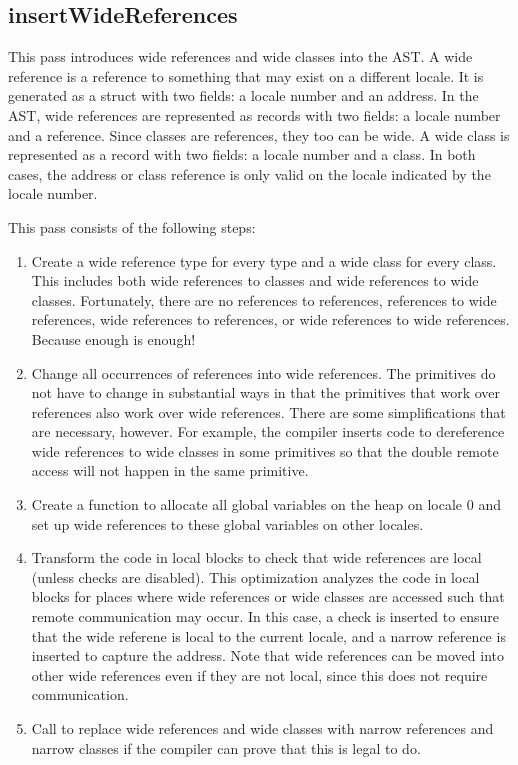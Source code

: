 \documentclass[10pt]{article}
\begin{document}
\subsection{insertWideReferences}

This pass introduces wide references and wide classes into the AST.  A
wide reference is a reference to something that may exist on a
different locale.  It is generated as a struct with two fields: a
locale number and an address.  In the AST, wide references are
represented as records with two fields: a locale number and a
reference.  Since classes are references, they too can be wide.  A
wide class is represented as a record with two fields: a locale number
and a class.  In both cases, the address or class reference is only
valid on the locale indicated by the locale number.

This pass consists of the following steps:
\begin{enumerate}
\item Create a wide reference type for every type and a wide class for
  every class.  This includes both wide references to classes and wide
  references to wide classes.  Fortunately, there are no references to
  references, references to wide references, wide references to
  references, or wide references to wide references.  Because enough
  is enough!

\item Change all occurrences of references into wide references.  The
  primitives do not have to change in substantial ways in that the
  primitives that work over references also work over wide references.
  There are some simplifications that are necessary, however.  For
  example, the compiler inserts code to dereference wide references to
  wide classes in some primitives so that the double remote access
  will not happen in the same primitive.

\item Create a function to allocate all global variables on the heap
  on locale 0 and set up wide references to these global variables on
  other locales.

\item Transform the code in local blocks to check that wide references
  are local (unless checks are disabled).  This optimization analyzes
  the code in local blocks for places where wide references or wide
  classes are accessed such that remote communication may occur.  In
  this case, a check is inserted to ensure that the wide referene is
  local to the current locale, and a narrow reference is inserted to
  capture the address.  Note that wide references can be moved into
  other wide references even if they are not local, since this does
  not require communication.

\item Call  to replace wide references and
  wide classes with narrow references and narrow classes if the
  compiler can prove that this is legal to do.
\end{enumerate}
\end{document}

